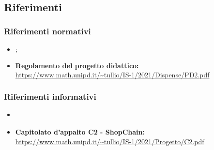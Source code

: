 \subsection{Riferimenti} \label{intro_riferimenti}
\subsubsection{Riferimenti normativi} \label{intro_riferimenti_normativi}
\begin{itemize}
  \item \textbf{\docNameVersionNdP};
  \item \textbf{Regolamento del progetto didattico:}\\\url{https://www.math.unipd.it/~tullio/IS-1/2021/Dispense/PD2.pdf}
\end{itemize}
\subsubsection{Riferimenti informativi} \label{intro_riferimenti_informativi}
\begin{itemize}
  \item \textbf{\docNameVersionAdR}
  \item \textbf{Capitolato d'appalto C2 - ShopChain:}\\\url{https://www.math.unipd.it/~tullio/IS-1/2021/Progetto/C2.pdf}
\end{itemize}